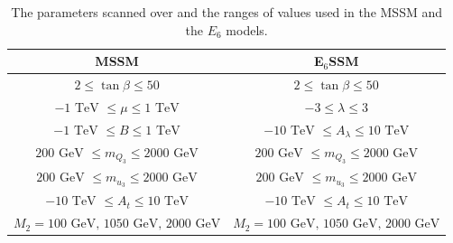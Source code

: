 \documentclass[preprint,amsmath,amssymb,aps,superscriptaddress,prd,showpacs,floatfix]{revtex4-1}
\begin{document}
\begin{table}[h]
\centering
\begin{ruledtabular}
\begin{tabular}{cc}
MSSM & E$_6$SSM \\
\hline
$2 \leq \tan\beta \leq 50$& $2 \leq \tan\beta \leq 50$ \\
$-1\textrm{ TeV } \leq \mu \leq 1 \textrm{ TeV}$ & $-3 \leq \lambda \leq 3$\\
$-1\textrm{ TeV } \leq B \leq 1\textrm{ TeV}$ & $-10\textrm{ TeV } \leq A_\lambda \leq 10\textrm{ TeV}$ \\
$ 200 \textrm{ GeV } \leq m_{Q_3} \leq 2000 \textrm { GeV}$ & $ 200 \textrm{ GeV } \leq m_{Q_3} \leq 2000 \textrm { GeV}$\\
$ 200 \textrm{ GeV } \leq m_{u_3} \leq 2000 \textrm { GeV}$ & $ 200 \textrm{ GeV } \leq m_{u_3} \leq 2000 \textrm { GeV}$\\
$ -10 \textrm{ TeV } \leq A_t \leq 10 \textrm { TeV}$ & $ -10 \textrm{ TeV } \leq A_t \leq 10 \textrm { TeV}$\\
$M_2=100\textrm{ GeV, } 1050\textrm{ GeV, } 2000 \textrm{ GeV}$ & $M_2=100\textrm{ GeV, } 1050\textrm{ GeV, } 2000 \textrm{ GeV}$ \\
\end{tabular}
\end{ruledtabular}
\caption{The parameters scanned over and the ranges of values used in the MSSM and the $E_6$ models.}
\label{tab:scanranges}
\end{table}

\end{document}
